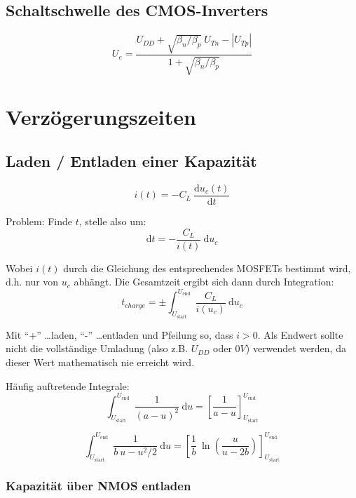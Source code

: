 \documentclass[a4paper,11pt]{article}
\begin{document}
\subsection*{Schaltschwelle des CMOS-Inverters}
\[
	\boxed{ \quad U_e = \frac{U_{DD} + \sqrt{\beta_n / \beta_p} ~ U_{Tn} - |U_{Tp}|}{1 + \sqrt{\beta_n / \beta_p}} \quad }
\]

\section*{Verzögerungszeiten}
\subsection*{Laden / Entladen einer Kapazität}
\[
	i(t) = -C_L ~ \frac{\mathrm du_c(t)}{\mathrm dt}
\]

Problem: Finde $t$, stelle also um:
\[
	\mathrm dt = - \frac{C_L}{i(t)} ~ \mathrm du_c
\]

Wobei $i(t)$ durch die Gleichung des entsprechendes MOSFETs bestimmt wird, d.h. nur von $u_c$ abhängt. Die Gesamtzeit ergibt sich dann durch Integration:
\[
	t_{charge} = \pm \int_{U_{\text{start}}}^{U_{\text{end}}} \frac{C_L}{i(u_c)} ~ \mathrm du_c
\]

Mit ``+'' \ldots laden, ``-'' \ldots entladen und Pfeilung so, dass $i > 0$. Als Endwert sollte nicht die vollständige Umladung (also z.B. $U_{DD}$ oder $0V$) verwendet werden, da dieser Wert mathematisch nie erreicht wird.

Häufig auftretende Integrale:
\[
	\int_{U_{\text{start}}}^{U_{\text{end}}} \frac{1}{(a - u)^2} ~ \mathrm du = \left[ \frac{1}{a - u} \right]_{U_{\text{start}}}^{U_{\text{end}}}
\]

\[
	\int_{U_{\text{start}}}^{U_{\text{end}}} \frac{1}{b ~ u - u^2 / 2} ~ \mathrm du = \left[ \frac{1}{b} ~ \ln \left( \frac{u}{u - 2b} \right) \right]_{U_{\text{start}}}^{U_{\text{end}}}
\]

\subsubsection*{Kapazität über NMOS entladen}
\end{document}
